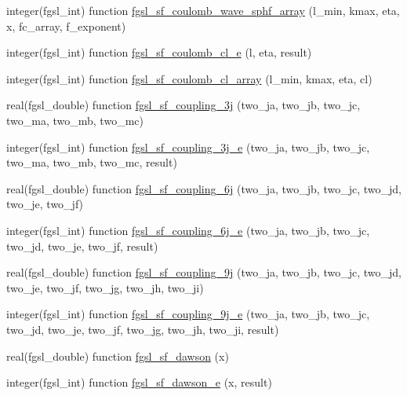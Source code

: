 \begin{DoxyCompactItemize}
\item 
integer(fgsl\-\_\-int) function \hyperlink{specfunc_8finc_a4b75330437d7b3314c613d2bdd1706d8}{fgsl\-\_\-sf\-\_\-coulomb\-\_\-wave\-\_\-sphf\-\_\-array} (l\-\_\-min, kmax, eta, x, fc\-\_\-array, f\-\_\-exponent)
\item 
integer(fgsl\-\_\-int) function \hyperlink{specfunc_8finc_a99a2eb4d58b6aa34c2ee31b1a255d0ea}{fgsl\-\_\-sf\-\_\-coulomb\-\_\-cl\-\_\-e} (l, eta, result)
\item 
integer(fgsl\-\_\-int) function \hyperlink{specfunc_8finc_afe3c9153c268283632e3f90f3bfb8bd3}{fgsl\-\_\-sf\-\_\-coulomb\-\_\-cl\-\_\-array} (l\-\_\-min, kmax, eta, cl)
\item 
real(fgsl\-\_\-double) function \hyperlink{specfunc_8finc_ae015149f5c9ca59e3031fe680d0e9881}{fgsl\-\_\-sf\-\_\-coupling\-\_\-3j} (two\-\_\-ja, two\-\_\-jb, two\-\_\-jc, two\-\_\-ma, two\-\_\-mb, two\-\_\-mc)
\item 
integer(fgsl\-\_\-int) function \hyperlink{specfunc_8finc_a3db589dce83b968f5b6621791e4e568a}{fgsl\-\_\-sf\-\_\-coupling\-\_\-3j\-\_\-e} (two\-\_\-ja, two\-\_\-jb, two\-\_\-jc, two\-\_\-ma, two\-\_\-mb, two\-\_\-mc, result)
\item 
real(fgsl\-\_\-double) function \hyperlink{specfunc_8finc_a959b7ee7f4c971f2054f116438fda348}{fgsl\-\_\-sf\-\_\-coupling\-\_\-6j} (two\-\_\-ja, two\-\_\-jb, two\-\_\-jc, two\-\_\-jd, two\-\_\-je, two\-\_\-jf)
\item 
integer(fgsl\-\_\-int) function \hyperlink{specfunc_8finc_a9847533ffaa754d197fbb6120badbeaf}{fgsl\-\_\-sf\-\_\-coupling\-\_\-6j\-\_\-e} (two\-\_\-ja, two\-\_\-jb, two\-\_\-jc, two\-\_\-jd, two\-\_\-je, two\-\_\-jf, result)
\item 
real(fgsl\-\_\-double) function \hyperlink{specfunc_8finc_a42140d537a50976fcb7da0a0853a612a}{fgsl\-\_\-sf\-\_\-coupling\-\_\-9j} (two\-\_\-ja, two\-\_\-jb, two\-\_\-jc, two\-\_\-jd, two\-\_\-je, two\-\_\-jf, two\-\_\-jg, two\-\_\-jh, two\-\_\-ji)
\item 
integer(fgsl\-\_\-int) function \hyperlink{specfunc_8finc_ac454227ac58ca2eff93e5fab56cb83a5}{fgsl\-\_\-sf\-\_\-coupling\-\_\-9j\-\_\-e} (two\-\_\-ja, two\-\_\-jb, two\-\_\-jc, two\-\_\-jd, two\-\_\-je, two\-\_\-jf, two\-\_\-jg, two\-\_\-jh, two\-\_\-ji, result)
\item 
real(fgsl\-\_\-double) function \hyperlink{specfunc_8finc_a26f4bdcc96e17a721cae630d62f2408b}{fgsl\-\_\-sf\-\_\-dawson} (x)
\item 
integer(fgsl\-\_\-int) function \hyperlink{specfunc_8finc_a1bfd7ee3ad93daa0cd3278f881e7ff20}{fgsl\-\_\-sf\-\_\-dawson\-\_\-e} (x, result)

\end{DoxyCompactItemize}
